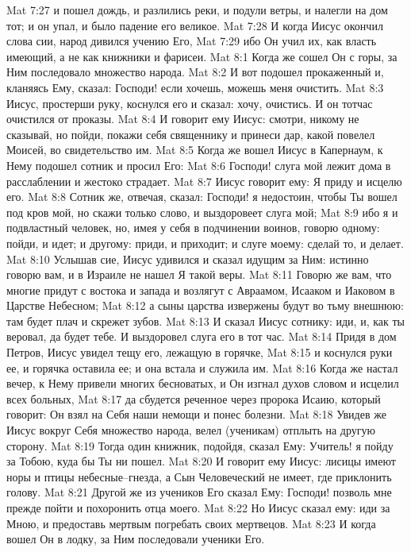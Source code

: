 Mat 7:27  и пошел дождь, и разлились реки, и подули ветры, и налегли на дом тот; и он упал, и было падение его великое.
Mat 7:28  И когда Иисус окончил слова сии, народ дивился учению Его,
Mat 7:29  ибо Он учил их, как власть имеющий, а не как книжники и фарисеи.
Mat 8:1  Когда же сошел Он с горы, за Ним последовало множество народа.
Mat 8:2  И вот подошел прокаженный и, кланяясь Ему, сказал: Господи! если хочешь, можешь меня очистить.
Mat 8:3  Иисус, простерши руку, коснулся его и сказал: хочу, очистись. И он тотчас очистился от проказы.
Mat 8:4  И говорит ему Иисус: смотри, никому не сказывай, но пойди, покажи себя священнику и принеси дар, какой повелел Моисей, во свидетельство им.
Mat 8:5  Когда же вошел Иисус в Капернаум, к Нему подошел сотник и просил Его:
Mat 8:6  Господи! слуга мой лежит дома в расслаблении и жестоко страдает.
Mat 8:7  Иисус говорит ему: Я приду и исцелю его.
Mat 8:8  Сотник же, отвечая, сказал: Господи! я недостоин, чтобы Ты вошел под кров мой, но скажи только слово, и выздоровеет слуга мой;
Mat 8:9  ибо я и подвластный человек, но, имея у себя в подчинении воинов, говорю одному: пойди, и идет; и другому: приди, и приходит; и слуге моему: сделай то, и делает.
Mat 8:10  Услышав сие, Иисус удивился и сказал идущим за Ним: истинно говорю вам, и в Израиле не нашел Я такой веры.
Mat 8:11  Говорю же вам, что многие придут с востока и запада и возлягут с Авраамом, Исааком и Иаковом в Царстве Небесном;
Mat 8:12  а сыны царства извержены будут во тьму внешнюю: там будет плач и скрежет зубов.
Mat 8:13  И сказал Иисус сотнику: иди, и, как ты веровал, да будет тебе. И выздоровел слуга его в тот час.
Mat 8:14  Придя в дом Петров, Иисус увидел тещу его, лежащую в горячке,
Mat 8:15  и коснулся руки ее, и горячка оставила ее; и она встала и служила им.
Mat 8:16  Когда же настал вечер, к Нему привели многих бесноватых, и Он изгнал духов словом и исцелил всех больных,
Mat 8:17  да сбудется реченное через пророка Исаию, который говорит: Он взял на Себя наши немощи и понес болезни.
Mat 8:18  Увидев же Иисус вокруг Себя множество народа, велел (ученикам) отплыть на другую сторону.
Mat 8:19  Тогда один книжник, подойдя, сказал Ему: Учитель! я пойду за Тобою, куда бы Ты ни пошел.
Mat 8:20  И говорит ему Иисус: лисицы имеют норы и птицы небесные--гнезда, а Сын Человеческий не имеет, где приклонить голову.
Mat 8:21  Другой же из учеников Его сказал Ему: Господи! позволь мне прежде пойти и похоронить отца моего.
Mat 8:22  Но Иисус сказал ему: иди за Мною, и предоставь мертвым погребать своих мертвецов.
Mat 8:23  И когда вошел Он в лодку, за Ним последовали ученики Его.
